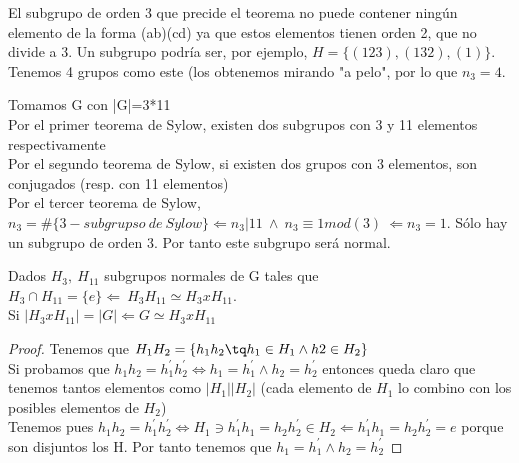 \documentclass[nochap]{apuntes}
\begin{document}
\begin{example}
 El subgrupo de orden 3 que precide el teorema no puede contener ningún elemento de la forma (ab)(cd) ya que estos elementos tienen
 orden 2, que no divide a 3. Un subgrupo podría ser, por ejemplo, $H=\{(123),(132),(1)\}$.\\
 Tenemos 4 grupos como este (los obtenemos mirando "a pelo", por lo que $n_3=4$.\\
 \end{example}

 \begin{example}
  Tomamos G con |G|=3*11\\
  Por el primer teorema de Sylow, existen dos subgrupos con 3 y 11 elementos respectivamente\\
  Por el segundo teorema de Sylow, si existen dos grupos con 3 elementos, son conjugados (resp. con 11 elementos)\\
  Por el tercer teorema de Sylow, $n_3=\#\{3-subgrupso \ de \ Sylow\} \Leftarrow n_3|11 \ \wedge \ n_3\equiv 1 mod(3) \ \Leftarrow n_3=1$.
  Sólo hay un subgrupo de orden 3. Por tanto este subgrupo será normal.
 \end{example}

 \begin{lemma}
  Dados $H_3, \ H_{11}$  subgrupos normales de G tales que $H_3\cap H_{11} = \{e\} \Leftarrow \ H_3H_{11} \simeq H_3 x H_{11}$.\\
  Si $|H_3xH_{11}|=|G| \Leftarrow G\simeq H_3xH_{11}$
 \end{lemma}
 \begin{proof}
  Tenemos que $H_1H_2=\{h_1h_2\tq h_1\in H_1 \wedge h2\in H_2\}$\\
  Si probamos que $h_1h_2=h_1^{'}h_2^{'} \Leftrightarrow h_1=h_1^{'} \wedge h_2=h_2^{'}$  entonces queda claro que tenemos tantos elementos como
  $|H_1||H_2|$ (cada elemento de $H_1$  lo combino con los posibles elementos de $H_2$)\\
  Tenemos pues $h_1h_2=h_1^{'}h_2^{'} \Leftrightarrow H_1\ni h_1^{'}h_1=h_2h_2^{'} \in H_2 \Leftarrow h_1^{'}h_1=h_2h_2^{'}=e$  porque son 
  disjuntos los H. Por tanto tenemos que $h_1=h_1^{'} \wedge h_2=h_2^{'}$
 \end{proof}
\end{document}

